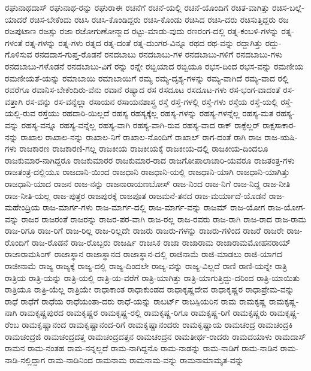 {ರಘುನಾಥದಾಸ್
ರಘುನಾಥ-ರನ್ನು
ರಘುರಾಈ
ರಚನೆಗೆ
ರಚನೆ-ಯಲ್ಲಿ
ರಚನೆ-ಯೊಂದಿಗೆ
ರಚಿತ-ವಾಗಿತ್ತು
ರಚಿಸ-ಬಲ್ಲೆ-ಯಾದರೆ
ರಚಿಸ-ಬೇಕೆಂದು
ರಚಿಸಿ
ರಚಿಸಿ-ಕೊಂಡಿದ್ದರು
ರಚಿಸಿ-ಕೊಂಡು
ರಚಿಸಿದ
ರಚಿಸಿ-ದರು
ರಚಿಸುತ್ತಿದ್ದರು
ರಜ
ರಜಪುಟಾಣ
ರಜಸ್ಸು
ರಜಾ
ರಜೋಗುಣೋನ್ಮಾದ
ರಟ್ಟು-ಮಾಡು-ವುದು
ರಣರಂಗ-ದಲ್ಲಿ
ರತ್ನ-ಕಂಬಳಿ-ಗಳನ್ನು
ರತ್ನ-ಗಳಂತೆ
ರತ್ನ-ಗಳನ್ನು
ರತ್ನ-ಗಳು
ರತ್ನದ
ರತ್ನ-ದಂತೆ
ರತ್ನ-ದುಂಗರ-ವಿನ್ನೂ
ರಥದ
ರಥ-ವನ್ನು
ರದ್ದಾಗಿತ್ತು
ರದ್ದು-ಗೊಳಿಸುವ
ರನದದಾಸ-ಗುಪ್ತ-ರೊಡನೆ
ರನದಬಾಬು
ರನದಬಾಬು-ಗಳ
ರನದಬಾಬು-ಗಳಿಗೆ
ರನದಬಾಬು-ಗಳು
ರನದಬಾಬು-ಗಳೊಡನೆ
ರನದಬಾಬು-ವಿಗೆ
ರನ್ನು
ರನ್ನೇ
ರಬ್ಬಿಯಾದ
ರಬ್ಬಿಯೂ
ರಭಸ-ದಿಂದ
ರಭಸ-ವನ್ನು
ರಮಣೀಯ
ರಮಣೀಯತೆ-ಯನ್ನು
ರಮಾಬಾಯಿ
ರಮಾಬಾಯಿಗೆ
ರಮ್ಯ
ರಮ್ಯ-ದೃಶ್ಯ-ಗಳನ್ನು
ರಮ್ಯ-ವಾಗಿದೆ
ರಮ್ಯ-ವಾದ
ರಲ್ಲಿ
ರವರೆಗೂ
ರವಾನಿಸ-ಬೇಕೆಂದಿರು-ವೆನು
ರವಾನೆ
ರಷ್ಯಾದ
ರಸ
ರಸದೂಟ
ರಸದೂಟ-ಗಳು
ರಸ-ಭಂಗ-ವಾದಂತೆ
ರಸ-ವತ್ತಾಗಿ
ರಸ-ವನ್ನು
ರಸ-ವನ್ನೆಲ್ಲಾ
ರಸಾಯನ
ರಸಾಯನಶಾಸ್ತ್ರ
ರಸ್ತೆ
ರಸ್ತೆ-ಗಳಲ್ಲಿ
ರಸ್ತೆ-ಗಳು
ರಸ್ತೆಯ
ರಸ್ತೆ-ಯಲ್ಲಿ
ರಸ್ತೆ-ಯಲ್ಲಿ-ರುವ
ರಸ್ತೆಯು
ರಹದಾರಿ-ಯಿಲ್ಲದೆ
ರಹಸ್ಯ
ರಹಸ್ಯಕ್ಕೆಲ್ಲ
ರಹಸ್ಯ-ಗಳನ್ನು
ರಹಸ್ಯ-ಗಳನ್ನೆಲ್ಲ
ರಹಸ್ಯ-ಮತ
ರಹಸ್ಯ-ವನ್ನು
ರಹಸ್ಯ-ವನ್ನೂ
ರಹಸ್ಯ-ವನ್ನೆಲ್ಲ
ರಹಸ್ಯ-ವಾಗಿ
ರಹಸ್ಯ-ವಾಗಿ-ರುವ
ರಹಸ್ಯ-ವಾದ
ರಾಕ್
ರಾಕ್ಫೆಲ್ಲರ್
ರಾಕ್ಷಸಾಕಾರ-ನನ್ನು
ರಾಖಾಲ
ರಾಖಾಲ-ನನ್ನು
ರಾಖಾಲ-ನಿಗೆ
ರಾಖಾಲ-ನೊಂದಿಗೆ
ರಾಖಾಲ್
ರಾಗ-ದಂತೆ
ರಾಗಿ
ರಾಜ
ರಾಜ-ಋಷಿ-ಗಳು
ರಾಜಕಾರಣ
ರಾಜಕಾರಣಿ-ಗಲ್ಲ
ರಾಜಕೀಯ
ರಾಜಕೀಯಕ್ಕೆ
ರಾಜಕೀಯ-ದಲ್ಲಿ
ರಾಜಕೀಯ-ದಿಂದಲೂ
ರಾಜಕುಮಾರ-ನಾಗಿದ್ದರೂ
ರಾಜಕುಮಾರರ
ರಾಜಕುಮಾರ-ರಾದ
ರಾಜಗೋಪಾಲಾಚಾರಿ-ಯವರೂ
ರಾಜತಂತ್ರ-ಗಳು
ರಾಜತಂತ್ರ-ದಲ್ಲಿಯೂ
ರಾಜದಾನಿ-ಯಿಂದ
ರಾಜಧಾನಿ
ರಾಜಧಾನಿ-ಯಲ್ಲಿ
ರಾಜಧಾನಿ-ಯಾಗಿ
ರಾಜಧಾನಿ-ಯಾಗಿತ್ತು
ರಾಜಧಾನಿ-ಯಾದ
ರಾಜನ
ರಾಜ-ನನ್ನು
ರಾಜನಾರಾಯಣಬೋಸ್
ರಾಜ-ನಿಂದ
ರಾಜ-ನಿಗೆ
ರಾಜ-ನಿದ್ದ
ರಾಜ-ನೀತಿ
ರಾಜ-ನೀತಿ-ಯಲ್ಲ
ರಾಜ-ಪುತ್ರರ
ರಾಜಪುರಕ್ಕೆ
ರಾಜಪೂತ
ರಾಜಮನೆ-ತನದ
ರಾಜ-ಮರ್ಯಾದೆ-ಯೊಡನೆ
ರಾಜ-ಮಹೇಂದ್ರಿಯ
ರಾಜ-ಮಾರ್ಗ-ಗಳು
ರಾಜ-ಮಾರ್ಗ-ದಲ್ಲಿ
ರಾಜ-ಮಾರ್ಗ-ವನ್ನು
ರಾಜಮ್
ರಾಜ-ಯೋಗ
ರಾಜ-ಯೋಗ-ವನ್ನು
ರಾಜರ
ರಾಜರಂತೆ
ರಾಜರನ್ನು
ರಾಜರ-ಪರ-ವಾಗಿ
ರಾಜ-ರಲ್ಲ
ರಾಜ-ರವರು
ರಾಜ-ರಾಗಿ
ರಾಜ-ರಾದ
ರಾಜ-ರಾಮ
ರಾಜ-ರಿಗೂ
ರಾಜ-ರಿಗೆ
ರಾಜ-ರಿಲ್ಲ
ರಾಜ-ರಿಲ್ಲದೇ
ರಾಜರು
ರಾಜರು-ಗಳನ್ನು
ರಾಜರು-ಗಳಿಂದ
ರಾಜರೆ
ರಾಜರೇ
ರಾಜ-ರೊಂದಿಗೆ
ರಾಜ-ರೊಡನೆ
ರಾಜ-ರೊಬ್ಬರು
ರಾಜರ್ಷಿ
ರಾಜಸಿಕ
ರಾಜಾ
ರಾಜಾರಾಮ
ರಾಜಾರಾಮಮೋಹನರಾಯ್
ರಾಜಾರಾಮಸಿಂಗ್
ರಾಜಾಸ್ಥಾನ
ರಾಜಾಸ್ಥಾನದ
ರಾಜಾಸ್ಥಾನ-ದಲ್ಲಿ
ರಾಜಿನಾಮೆ
ರಾಜಿ-ಮಾಡಲು
ರಾಜಿ-ಯಾಗದ
ರಾಜೀನಾಮೆ
ರಾಜ್ಯ
ರಾಜ್ಯಕ್ಕೆ
ರಾಜ್ಯ-ದಲ್ಲಿ
ರಾಜ್ಯ-ದಿಂದಲೇ
ರಾಜ್ಯ-ವನ್ನು
ರಾಜ್ಯ-ವಿಲ್ಲದೆ
ರಾಣಿ
ರಾಣಿ-ಯನ್ನೇ
ರಾತ್ರಿ
ರಾತ್ರಿಯ
ರಾತ್ರಿ-ಯನ್ನು
ರಾತ್ರಿ-ಯಲ್ಲಿ
ರಾತ್ರಿ-ಯ-ವರೆಗೆ
ರಾತ್ರಿ-ಯಾಗಿತ್ತು
ರಾತ್ರಿ-ಯಾಗುತ್ತಿದ್ದು-ದರಿಂದ
ರಾತ್ರಿ-ಯಾಯಿತು
ರಾತ್ರಿಯೂ
ರಾತ್ರಿ-ಯೆಲ್ಲ
ರಾತ್ರಿಯೇ
ರಾಧಾಕಾಂತ
ರಾಧಾಕುಂಡದ
ರಾಧಾಕೃಷ್ಣದೇವ
ರಾಧಾಕೃಷ್ಣರ
ರಾಧಾಪ್ರೇಮ-ವನ್ನು
ರಾಧೆ
ರಾಧೆಗೆ
ರಾಧೆಯ
ರಾಧೆಯಂತಾ-ದರು
ರಾಧೆ-ಯನ್ನು
ರಾಬರ್ಟ್
ರಾಬಸ್ಪಿಯರಿನ
ರಾಮ
ರಾಮಕೃಷ್ಣ
ರಾಮಕೃಷ್ಣ-ನಾಗಿ
ರಾಮಕೃಷ್ಣಪುರದ
ರಾಮಕೃಷ್ಣರ
ರಾಮಕೃಷ್ಣ-ರಲ್ಲಿ
ರಾಮಕೃಷ್ಣ-ರಿಗೂ
ರಾಮಕೃಷ್ಣ-ರಿಗೆ
ರಾಮಕೃಷ್ಣರು
ರಾಮಕೃಷ್ಣ-ರೆಂಬ
ರಾಮಕೃಷ್ಣಾನಂದ
ರಾಮಕೃಷ್ಣಾನಂದ-ರಿಗೆ
ರಾಮಕೃಷ್ಣಾನಂದರು
ರಾಮಕೃಷ್ಣಾಯ
ರಾಮಚಂದ್ರ
ರಾಮಚಂದ್ರಕಿ
ರಾಮಚಂದ್ರಜಿ
ರಾಮಚಂದ್ರದತ್ತ
ರಾಮಚಂದ್ರದತ್ತನ
ರಾಮಚಂದ್ರನ
ರಾಮತೀರ್ಥ-ರಾದರು
ರಾಮದಯಾಳು
ರಾಮದಾಸ್
ರಾಮನ
ರಾಮ-ನಂತಹ
ರಾಮ-ನನ್ನಲ್ಲದೆ
ರಾಮ-ನಾಗಿದ್ದನೊ
ರಾಮ-ನಾಡನ್ನು
ರಾಮ-ನಾಡಿಗೆ
ರಾಮ-ನಾಡಿನ
ರಾಮ-ನಾಡಿ-ನಲ್ಲಿದ್ದಾಗ
ರಾಮ-ನಾಡಿನಿಂದ
ರಾಮನಾಮ
ರಾಮನಾಮ-ವನ್ನು
ರಾಮನಾಮಾಮೃತ-ವನ್ನು
}
